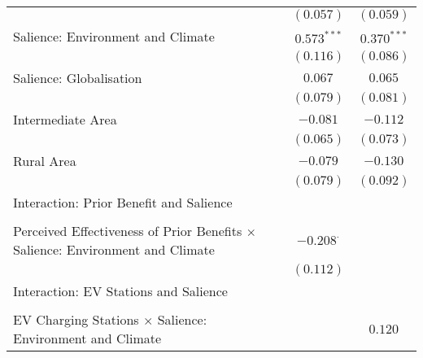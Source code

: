 \begin{center}
\begin{tiny}
\begin{longtable}{l@{} c@{} c@{}}
                                                                                           & $(0.057)$        & $(0.059)$      \\
\quad Salience: Environment and Climate                                                    & $0.573^{***}$    & $0.370^{***}$  \\
                                                                                           & $(0.116)$        & $(0.086)$      \\
\quad Salience: Globalisation                                                              & $0.067$          & $0.065$        \\
                                                                                           & $(0.079)$        & $(0.081)$      \\
\quad Intermediate Area                                                                    & $-0.081$         & $-0.112$       \\
                                                                                           & $(0.065)$        & $(0.073)$      \\
\quad Rural Area                                                                           & $-0.079$         & $-0.130$       \\
                                                                                           & $(0.079)$        & $(0.092)$      \\
Interaction: Prior Benefit and Salience                                                    &                  &                \\
                                                                                           &                  &                \\
\quad Perceived Effectiveness of Prior Benefits $\times$ Salience: Environment and Climate & $-0.208^{\cdot}$ &                \\
                                                                                           & $(0.112)$        &                \\
Interaction: EV Stations and Salience                                                      &                  &                \\
                                                                                           &                  &                \\
\quad EV Charging Stations $\times$ Salience: Environment and Climate                      &                  & $0.120$        \\

\end{longtable}
\end{tiny}
\end{center}
